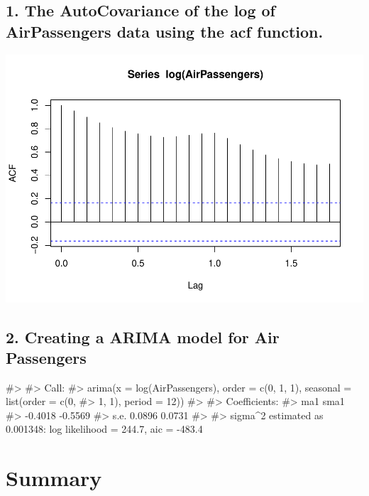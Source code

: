\hypertarget{the-autocovariance-of-the-log-of-airpassengers-data-using-the-acf-function.}{%
\subsection{1. The AutoCovariance of the log of AirPassengers data using
the acf
function.}\label{the-autocovariance-of-the-log-of-airpassengers-data-using-the-acf-function.}}

\begin{Schunk}

\includegraphics{Abhi-1U_files/figure-latex/unnamed-chunk-1-1} \end{Schunk}

\hypertarget{creating-a-arima-model-for-air-passengers}{%
\subsection{2. Creating a ARIMA model for Air
Passengers}\label{creating-a-arima-model-for-air-passengers}}

\begin{Schunk}
\begin{Soutput}
#> 
#> Call:
#> arima(x = log(AirPassengers), order = c(0, 1, 1), seasonal = list(order = c(0, 
#>     1, 1), period = 12))
#> 
#> Coefficients:
#>           ma1     sma1
#>       -0.4018  -0.5569
#> s.e.   0.0896   0.0731
#> 
#> sigma^2 estimated as 0.001348:  log likelihood = 244.7,  aic = -483.4
\end{Soutput}
\end{Schunk}

\hypertarget{summary}{%
\section{Summary}\label{summary}}

